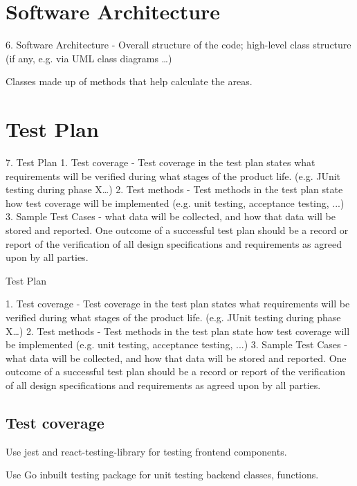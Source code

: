 \documentclass[a4paper,11pt]{article}
\begin{document}
\section{Software Architecture}

6. Software Architecture - Overall structure of the code; high-level class structure (if any, e.g. via UML class diagrams …)



Classes made up of methods that help calculate the areas.

\section{Test Plan}

7. Test Plan
  1. Test coverage - Test coverage in the test plan states what requirements will be verified during what stages of the product life. (e.g. JUnit testing during phase X…)
  2. Test methods - Test methods in the test plan state how test coverage will be implemented (e.g. unit testing, acceptance testing, ...)
  3. Sample Test Cases - what data will be collected, and how that data will be stored and reported. One outcome of a successful test plan should be a record or report of the verification of all design specifications and requirements as agreed upon by all parties.


Test Plan

1. Test coverage - Test coverage in the test plan states what requirements will be verified during what stages of the product life. (e.g. JUnit testing during phase X…)
2. Test methods - Test methods in the test plan state how test coverage will be implemented (e.g. unit testing, acceptance testing, ...)
3. Sample Test Cases - what data will be collected, and how that data will be stored and reported. One outcome of a successful test plan should be a record or report of the verification of all design specifications and requirements as agreed upon by all parties.

\subsection{Test coverage}


Use jest and react-testing-library for testing frontend components.

Use Go inbuilt testing package for unit testing backend classes, functions.
\end{document}
